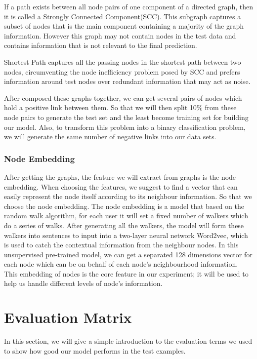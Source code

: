 \documentclass[a4paper,11pt]{article}
\begin{document}
If a path exists between all node pairs of one component of a directed graph, then it is called a Strongly Connected Component(SCC). This subgraph captures a subset of nodes that is the main component containing a majority of the graph information. However this graph may not contain nodes in the test data and contains information that is not relevant to the final prediction.

Shortest Path captures all the passing nodes in the shortest path between two nodes, circumventing the node inefficiency problem posed by SCC and prefers information around test nodes over redundant information that may act as noise.

After composed these graphs together, we can get several pairs of nodes which hold a positive link between them. So that we will then split 10\% from these node pairs to generate the test set and the least become training set for building our model. Also, to transform this problem into a binary classification problem, we will generate the same number of negative links into our data sets.


\subsubsection{Node Embedding}
After getting the graphs, the feature we will extract from graphs is the node embedding. When choosing the features, we suggest to find a vector that can easily represent the node itself according to its neighbour information. So that we choose the node embedding. The node embedding is a model that based on the random walk algorithm, for each user it will set a fixed number of walkers which do a series of walks. After generating all the walkers, the model will form these walkers into sentences to input into a two-layer neural network Word2vec, which is used to catch the contextual information from the neighbour nodes. In this unsupervised pre-trained model, we can get a separated 128 dimensions vector for each node which can be on behalf of each node's neighbourhood information. This embedding of nodes is the core feature in our experiment; it will be used to help us handle different levels of node's information.

\section{Evaluation Matrix}
In this section, we will give a simple introduction to the evaluation terms we used to show how good our model performs in the test examples.
\end{document}
